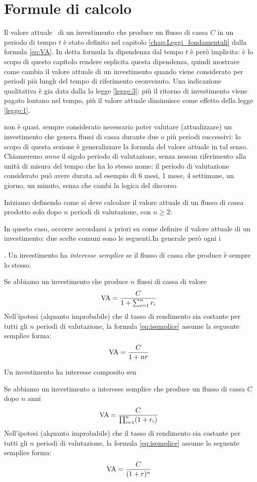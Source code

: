 \chapter{Formule di calcolo}
\label{chap:Formule_fondamentali}

Il valore attuale \VA\ di un investimento che produce un flusso di cassa
$C$ in un periodo di tempo $t$ è stato definito nel capitolo \ref{chap:Leggi_fondamentali}
dalla formula \eqref{eq:VA}. In detta formula la dipendenza dal tempo $t$ è però implicita:
è lo scopo di questo capitolo rendere esplicita questa dipendenza, quindi mostrare come cambia
il valore attuale di un investimento quando viene considerato per periodi più lungh del tempo
di riferimento ceonvenuto. Una indicazione qualitativa è gia data dalla la legge \ref{legge:3}:
più il ritorno di investimento viene pagato lontano nel tempo, più il valore attuale diminuisce
come effetto della legge \ref{legge:1}.
 
non è quasi. sempre considerato  necessario
poter valutare (attualizzare) un investimento che genera flussi di cassa durante
due o più periodi successivi: lo scopo di questa sezione è generalizzare la formula
del valore attuale in tal senso. Chiameremo \emph{anno} il sigolo periodo di valutazione,
senza nessun riferimento alla unità di misura del tempo che ha lo stesso nome: il periodo
di valutazione considerato può avere durata ad esempio di 6 mesi, 1 mese, 4 settimane, un
giorno, un minuto, senza che cambi la logica del discorso

Iniziamo definendo come si deve calcolare il valore attuale di un flusso di cassa
prodotto solo dopo $n$ periodi di valutazione, con $n\ge 2$:

In questo caso, occorre accordarsi a priori su come definire il valore attuale
di un investimento: due scelte comuni sono le seguenti.In generale però ogni i
\begin{defn}. Un investimento ha \emph{interesse semplice} se il flusso di cassa
  che produce è sempre lo stesso.
\end{defn}
Se abbiamo un investimento che produce $n$ flussi di cassa di valore 
\begin{equation}
  \label{eq:isemplice}
  \mathrm{VA}=\frac{C}{1+\sum_{i=1}^nr_i}
\end{equation}
Nell'ipotesi  (alquanto improbabile) che il tasso di rendimento sia costante per tutti
gli $n$ periodi di valutazione, la formula \eqref{eq:isemplice} assume la seguente semplice
forma:
\[
  \mathrm{VA}=\frac{C}{1+nr}
\]
\begin{defn}
  Un investimento ha interesse composito sen
\end{defn}
Se abbiamo un investimento a interesse semplice che produce un flusso di cassa $C$ dopo
$n$ anni
\begin{equation}
  \label{eq:icomposto}
  \mathrm{VA}=\frac{C}{\prod_{i=1}^n(1+r_i)}
\end{equation}
Nell'ipotesi  (alquanto improbabile) che il tasso di rendimento sia costante per tutti
gli $n$ periodi di valutazione, la formula \eqref{eq:isemplice} assume la seguente semplice
forma:
\[
  \mathrm{VA}=\frac{C}{(1+r)^n}
\]

